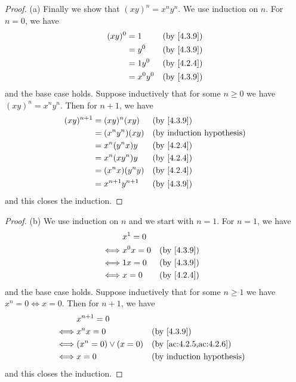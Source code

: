 \begin{proof}{(a)}
  Finally we show that \((xy)^n = x^n y^n\).
  We use induction on \(n\).
  For \(n = 0\), we have
  \begin{align*}
    (xy)^0 & = 1       &  & \by{4.3.9} \\
           & = y^0     &  & \by{4.3.9} \\
           & = 1y^0    &  & \by{4.2.4} \\
           & = x^0 y^0 &  & \by{4.3.9}
  \end{align*}
  and the base case holds.
  Suppose inductively that for some \(n \geq 0\) we have \((xy)^n = x^n y^n\).
  Then for \(n + 1\), we have
  \begin{align*}
    (xy)^{n + 1} & = (xy)^n (xy)         &  & \by{4.3.9} \\
                 & = (x^n y^n) (xy)      &  & \byIH      \\
                 & = x^n (y^n x) y       &  & \by{4.2.4} \\
                 & = x^n (x y^n) y       &  & \by{4.2.4} \\
                 & = (x^n x)(y^n y)      &  & \by{4.2.4} \\
                 & = x^{n + 1} y^{n + 1} &  & \by{4.3.9}
  \end{align*}
  and this closes the induction.
\end{proof}

\begin{proof}{(b)}
  We use induction on \(n\) and we start with \(n = 1\).
  For \(n = 1\), we have
  \begin{align*}
         & x^1 = 0                   \\
    \iff & x^0 x = 0 &  & \by{4.3.9} \\
    \iff & 1x = 0    &  & \by{4.3.9} \\
    \iff & x = 0     &  & \by{4.2.4}
  \end{align*}
  and the base case holds.
  Suppose inductively that for some \(n \geq 1\) we have \(x^n = 0 \iff x = 0\).
  Then for \(n + 1\), we have
  \begin{align*}
         & x^{n + 1} = 0                                                    \\
    \iff & x^n x = 0              &  & \by{4.3.9}                           \\
    \iff & (x^n = 0) \lor (x = 0) &  & \text{(by \cref{ac:4.2.5,ac:4.2.6})} \\
    \iff & x = 0                  &  & \byIH
  \end{align*}
  and this closes the induction.
\end{proof}

